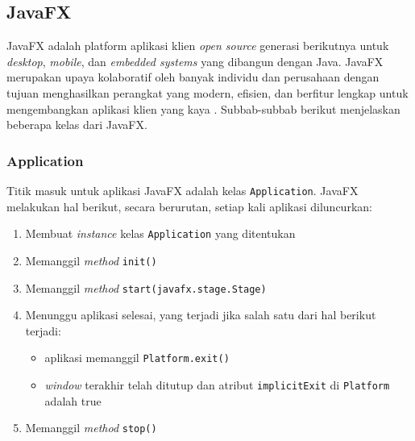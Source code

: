 \subsection{JavaFX}
\label{sec:javafx}
JavaFX adalah platform aplikasi klien \textit{open source} generasi berikutnya untuk \textit{desktop}, \textit{mobile}, dan \textit{embedded systems} yang dibangun dengan Java. JavaFX merupakan upaya kolaboratif oleh banyak individu dan perusahaan dengan tujuan menghasilkan perangkat yang modern, efisien, dan berfitur lengkap untuk mengembangkan aplikasi klien yang kaya \cite{javafx}. Subbab-subbab berikut menjelaskan beberapa kelas dari JavaFX. \cite{javafx}


\subsubsection{Application}
Titik masuk untuk aplikasi JavaFX adalah kelas \texttt{Application}. JavaFX melakukan hal berikut, secara berurutan, setiap kali aplikasi diluncurkan:
\begin{enumerate}
    \item Membuat \textit{instance} kelas \texttt{Application} yang ditentukan
    \item Memanggil \textit{method} \texttt{init()}
    \item Memanggil \textit{method} \texttt{start(javafx.stage.Stage)}
    \item Menunggu aplikasi selesai, yang terjadi jika salah satu dari hal berikut terjadi:
    \begin{itemize}
        \item aplikasi memanggil \texttt{Platform.exit()}
        \item \textit{window} terakhir telah ditutup dan atribut \texttt{implicitExit} di \texttt{Platform} adalah true    
    \end{itemize}
    \item Memanggil \textit{method} \texttt{stop()}
\end{enumerate}

